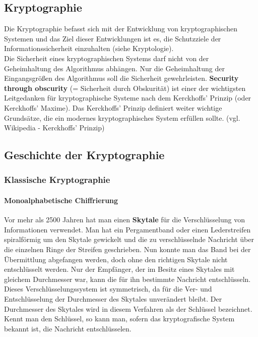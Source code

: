 \documentclass[12pt,a4paper]{report}
\begin{document}
\begin{onehalfspace}
\section{Kryptographie}

Die Kryptographie befasst sich mit der Entwicklung von kryptographischen Systemen und das Ziel dieser Entwicklungen ist es, die Schutzziele der Informationssicherheit einzuhalten (siehe Kryptologie). \\
Die Sicherheit eines kryptographischen Systems darf nicht von der Geheimhaltung des Algorithmus abhängen. Nur die Geheimhaltung der Eingangsgrößen des Algorithmus soll die Sicherheit gewehrleisten. \textbf{Security through obscurity} (= Sicherheit durch Obskurität) ist einer der wichtigsten Leitgedanken für kryptographische Systeme nach dem Kerckhoffs' Prinzip (oder Kerckhoffs' Maxime). Das Kerckhoffs' Prinzip definiert weiter wichtige Grundsätze, die ein modernes kryptographisches System erfüllen sollte. (vgl. Wikipedia - Kerckhoffs' Prinzip)

\subsection{Geschichte der Kryptographie}

\subsubsection{Klassische Kryptographie}

\paragraph{Monoalphabetische Chiffrierung}

Vor mehr als 2500 Jahren hat man einen \textbf{Skytale} für die Verschlüsselung von Informationen verwendet. Man hat ein Pergamentband oder einen Lederstreifen spiralförmig um den Skytale gewickelt und die zu verschlüsselnde Nachricht über die einzelnen Ringe der Streifen geschrieben. Nun konnte man das Band bei der Übermittlung abgefangen werden, doch ohne den richtigen Skytale nicht entschlüsselt werden. Nur der Empfänger, der im Besitz eines Skytales mit gleichem Durchmesser war, kann die für ihn bestimmte Nachricht entschlüsseln. Dieses Verschlüsselungssystem ist symmetrisch, da für die Ver- und Entschlüsselung der Durchmesser des Skytales unverändert bleibt. Der Durchmesser des Skytales wird in diesem Verfahren als der Schlüssel bezeichnet. Kennt man den Schlüssel, so kann man, sofern das kryptografische System bekannt ist, die Nachricht entschlüsselen. \cite{krypto01}\\\\


\end{onehalfspace}
\end{document}
